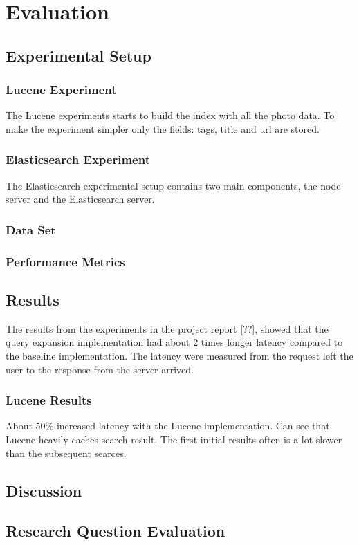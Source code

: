 \chapter{Evaluation}
\label{ch:evaluation}

\section{Experimental Setup}

\subsection{Lucene Experiment}
The Lucene experiments starts to build the index with all the photo data.
To make the experiment simpler only the fields: tags, title and url are stored.

\subsection{Elasticsearch Experiment}
The Elasticsearch experimental setup contains two main components, the node server and the Elasticsearch server.

\subsection{Data Set}
\label{sec:dataset}

\subsection{Performance Metrics}

\section{Results}
\label{sec:results}
The results from the experiments in the project report [??],
showed that the query expansion implementation had about 2 times longer latency compared to the baseline implementation.
The latency were measured from the request left the user to the response from the server arrived.


\subsection{Lucene Results}
About 50\% increased latency with the Lucene implementation.
Can see that Lucene heavily caches search result.
The first initial results often is a lot slower than the subsequent searces.

\section{Discussion}

\section{Research Question Evaluation}

